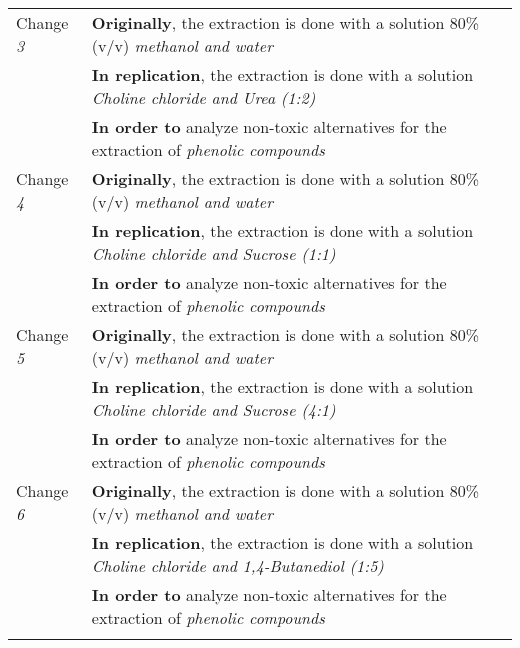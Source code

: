 \begin{table*}[h]
\begin{tabularx}{\textwidth}{
  >{\hsize=0.25\hsize}X
  >{\hsize=0.8\hsize}X}
    Change \textit{3}   & \textbf{Originally}, the extraction is done with a solution 80\% (v/v) \emph{methanol and water}  \\& \textbf{In replication}, the extraction is done with a solution \emph{Choline chloride and Urea (1:2)}  \\& \textbf{In order to} analyze non-toxic alternatives for the extraction of \emph{phenolic compounds}   \\ 
    \noalign{\smallskip\smallskip}\hline 
    
    Change \textit{4}   & \textbf{Originally}, the extraction is done with a solution 80\% (v/v) \emph{methanol and water}  \\& \textbf{In replication}, the extraction is done with a solution \emph{Choline chloride and Sucrose (1:1)}  \\& \textbf{In order to} analyze non-toxic alternatives for the extraction of \emph{phenolic compounds}   \\ 
    \noalign{\smallskip\smallskip}\hline 
    
    Change \textit{5}   & \textbf{Originally}, the extraction is done with a solution 80\% (v/v) \emph{methanol and water}  \\& \textbf{In replication}, the extraction is done with a solution \emph{Choline chloride and Sucrose (4:1)}  \\& \textbf{In order to} analyze non-toxic alternatives for the extraction of \emph{phenolic compounds}   \\ 
    \noalign{\smallskip\smallskip}\hline 
    
    Change \textit{6}   & \textbf{Originally}, the extraction is done with a solution 80\% (v/v) \emph{methanol and water}  \\& \textbf{In replication}, the extraction is done with a solution \emph{Choline chloride and 1,4-Butanediol (1:5)}  \\& \textbf{In order to} analyze non-toxic alternatives for the extraction of \emph{phenolic compounds}   \\ 
    \noalign{\smallskip\smallskip}\hline 
    

    
     
   	
	\end{tabularx}  
\end{table*}
